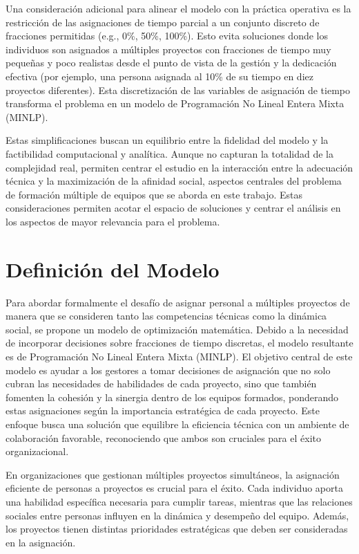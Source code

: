 \documentclass[conference]{IEEEtran}
\begin{document}
Una consideración adicional para alinear el modelo con la práctica operativa es la restricción de las asignaciones de tiempo parcial a un conjunto discreto de fracciones permitidas (e.g., 0\%, 50\%, 100\%). Esto evita soluciones donde los individuos son asignados a múltiples proyectos con fracciones de tiempo muy pequeñas y poco realistas desde el punto de vista de la gestión y la dedicación efectiva (por ejemplo, una persona asignada al 10\% de su tiempo en diez proyectos diferentes). Esta discretización de las variables de asignación de tiempo transforma el problema en un modelo de Programación No Lineal Entera Mixta (MINLP).

Estas simplificaciones buscan un equilibrio entre la fidelidad del modelo y la factibilidad computacional y analítica. Aunque no capturan la totalidad de la complejidad real, permiten centrar el estudio en la interacción entre la adecuación técnica y la maximización de la afinidad social, aspectos centrales del problema de formación múltiple de equipos que se aborda en este trabajo. Estas consideraciones permiten acotar el espacio de soluciones y centrar el análisis en los aspectos de mayor relevancia para el problema.

\section{Definición del Modelo}

Para abordar formalmente el desafío de asignar personal a múltiples proyectos de manera que se consideren tanto las competencias técnicas como la dinámica social, se propone un modelo de optimización matemática. Debido a la necesidad de incorporar decisiones sobre fracciones de tiempo discretas, el modelo resultante es de Programación No Lineal Entera Mixta (MINLP). El objetivo central de este modelo es ayudar a los gestores a tomar decisiones de asignación que no solo cubran las necesidades de habilidades de cada proyecto, sino que también fomenten la cohesión y la sinergia dentro de los equipos formados, ponderando estas asignaciones según la importancia estratégica de cada proyecto. Este enfoque busca una solución que equilibre la eficiencia técnica con un ambiente de colaboración favorable, reconociendo que ambos son cruciales para el éxito organizacional.

En organizaciones que gestionan múltiples proyectos simultáneos, la asignación eficiente de personas a proyectos es crucial para el éxito. Cada individuo aporta una habilidad específica necesaria para cumplir tareas, mientras que las relaciones sociales entre personas influyen en la dinámica y desempeño del equipo. Además, los proyectos tienen distintas prioridades estratégicas que deben ser consideradas en la asignación.
\end{document}

